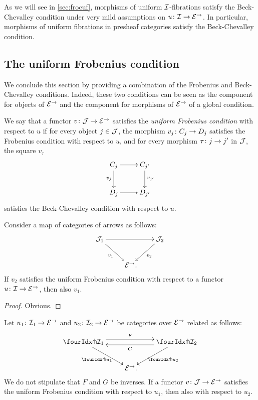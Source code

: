 \documentclass[reqno,10pt,a4paper,oneside,draft]{amsart}
\begin{document}
As we will see in \cref{sec:frocuf}, morphisms of uniform $\cal{I}$-fibrations satisfy the Beck-Chevalley condition under very mild assumptions on $u \co \cal{I} \to \catE^\to$.
In particular, morphisms of uniform fibrations in presheaf categories satisfy the Beck-Chevalley condition.

\subsection*{The uniform Frobenius condition}

We conclude this section by providing a combination of the Frobenius and Beck-Chevalley conditions.
Indeed, these two conditions can be seen as the component for objects of $\catE^\to$ and the component for morphisms of $\catE^\to$ of a global condition.

\begin{definition}
We say that a functor $v \co \cal{J} \to \catE^\to$ satisfies the \emph{uniform Frobenius condition} with respect to $u$ if for every object $j \in \cal{J}$, the morphism $v_j \co C_j \to D_j$ satisfies the Frobenius condition with respect to $u$, and for every morphism $\tau \co j \to j'$ in $\cal{J}$, the square $v_\tau$
\[
\xymatrix{
C_j \ar[r] \ar[d]_{v_j} & C_{j'} \ar[d]^{v_{j'}} \\
D_j \ar[r] & D_{j'}}
\]
satisfies the Beck-Chevalley condition with respect to $u$.
\end{definition}

\begin{proposition} \label{uniform-frobenius-change-v}
Consider a map of categories of arrows as follows:
\[
\xymatrix{
  \cal{J}_1
  \ar[rr]
  \ar[dr]_{v_1}
&&
  \cal{J}_2
  \ar[dl]^{v_2}
\\&
  \catE^\to
\rlap{.}}
\]
If $v_2$ satisfies the uniform Frobenius condition with respect to a functor $u \co \cal{I} \to \catE^\to$, then also $v_1$.
\end{proposition}

\begin{proof}
Obvious.
\end{proof}

\begin{proposition} \label{uniform-frobenius-change-u}
Let $u_1 \co \cal{I}_1 \to \catE^\to$ and $u_2 \co \cal{I}_2 \to \catE^\to$ be categories over $\catE^\to$ related as follows:
\[
\xymatrix{
  \liftr{\cal{I}_1}
  \ar@<4pt>[rr]^{F}
  \ar[dr]_{\liftr{u_1}}
&&
  \liftr{\cal{I}_2}
  \ar@<4pt>[ll]^{G}
  \ar[dl]^{\liftr{u_2}}
\\&
  \catE^\to
\rlap{.}}
\]
We do not stipulate that $F$ and $G$ be inverses.
If a functor $v \co \cal{J} \to \catE^\to$ satisfies the uniform Frobenius condition with respect to $u_1$, then also with respect to $u_2$.
\end{proposition}
\end{document}
